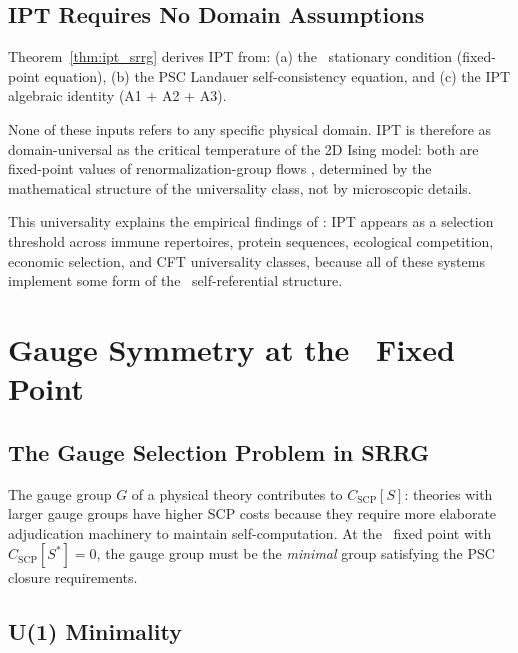 \documentclass[11pt]{article}
\theoremstyle{remark}
\newcommand{\SRRG}{\text{SRRG}}
\newcommand{\Sstar}{S^*}
\begin{document}
\subsection{IPT Requires No Domain Assumptions}
\label{sec:ipt_universal}

Theorem~\ref{thm:ipt_srrg} derives IPT from:
(a) the \SRRG\ stationary condition (fixed-point equation),
(b) the PSC Landauer self-consistency equation, and
(c) the IPT algebraic identity (A1 + A2 + A3).

None of these inputs refers to any specific physical domain. IPT is therefore
as domain-universal as the critical temperature of the 2D Ising model:
both are fixed-point values of renormalization-group flows \cite{Wilson1971,ZamolodchikovCTheorem},
determined by the mathematical structure of the universality class, not by microscopic details.

This universality explains the empirical findings of \cite{SpivackIPT,SpivackGeneralSelection}:
IPT appears as a selection threshold across immune repertoires, protein sequences,
ecological competition, economic selection, and CFT universality classes, because
all of these systems implement some form of the \SRRG\ self-referential structure.


\section{Gauge Symmetry at the \SRRG\ Fixed Point}
\label{sec:gauge}

\subsection{The Gauge Selection Problem in SRRG}
\label{sec:gauge_problem}

The gauge group $G$ of a physical theory contributes to $C_{\text{SCP}}[S]$:
theories with larger gauge groups have higher SCP costs because they require
more elaborate adjudication machinery to maintain self-computation. At the
\SRRG\ fixed point with $C_{\text{SCP}}[\Sstar] = 0$, the gauge group must be
the \emph{minimal} group satisfying the PSC closure requirements.

\subsection{U(1) Minimality}
\label{sec:u1}
\end{document}
